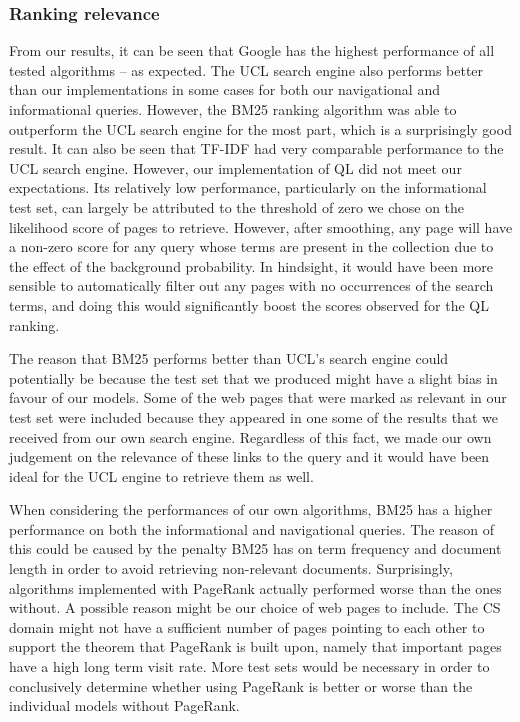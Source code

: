 \subsubsection{Ranking relevance}
From our results, it can be seen that Google has the highest performance of all tested algorithms -- as expected. The UCL search engine also performs better than our implementations in some cases for both our navigational and informational queries. However, the BM25 ranking algorithm was able to outperform the UCL search engine for the most part, which is a surprisingly good result. It can also be seen that TF-IDF had very comparable performance to the UCL search engine. However, our implementation of QL did not meet our expectations. Its relatively low performance, particularly on the informational test set, can largely be attributed to the threshold of zero we chose on the likelihood score of pages to retrieve. However, after smoothing, any page will have a non-zero score for any query whose terms are present in the collection due to the effect of the background probability. In hindsight, it would have been more sensible to automatically filter out any pages with no occurrences of the search terms, and doing this would significantly boost the scores observed for the QL ranking.

The reason that BM25 performs better than UCL's search engine could potentially be because the test set that we produced might have a slight bias in favour of our models. Some of the web pages that were marked as relevant in our test set were included because they appeared in one some of the results that we received from our own search engine. Regardless of this fact, we made our own judgement on the relevance of these links to the query and it would have been ideal for the UCL engine to retrieve them as well. 

When considering the performances of our own algorithms, BM25 has a higher performance on both the informational and navigational queries. The reason of this could be caused by the penalty BM25 has on term frequency and document length in order to avoid retrieving non-relevant documents. Surprisingly, algorithms implemented with PageRank actually performed worse than the ones without. A possible reason might be our choice of web pages to include. The CS domain might not have a sufficient number of pages pointing to each other to support the theorem that PageRank is built upon, namely that important pages have a high long term visit rate. More test sets would be necessary in order to conclusively determine whether using PageRank is better or worse than the individual models without PageRank. 


